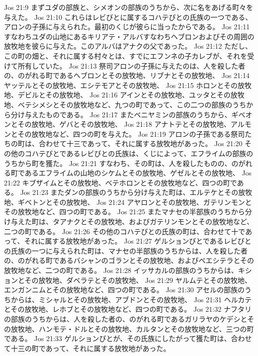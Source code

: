 Jos 21:9  まずユダの部族と、シメオンの部族のうちから、次に名をあげる町々を与えた。
Jos 21:10  これらはレビびとに属するコハテびとの氏族の一つである、アロンの子孫に与えられた。最初のくじが彼らに当ったからである。
Jos 21:11  すなわちユダの山地にあるキリアテ・アルバすなわちヘブロンおよびその周囲の放牧地を彼らに与えた。このアルバはアナクの父であった。
Jos 21:12  ただし、この町の畑と、それに属する村々とは、すでにエフンネの子カレブが、それを受けて所有していた。
Jos 21:13  祭司アロンの子孫に与えたのは、人を殺した者の、のがれる町であるヘブロンとその放牧地、リブナとその放牧地、
Jos 21:14  ヤッテルとその放牧地、エシテモアとその放牧地、
Jos 21:15  ホロンとその放牧地、デビルとその放牧地、
Jos 21:16  アインとその放牧地、ユッタとその放牧地、ベテシメシとその放牧地など、九つの町であって、この二つの部族のうちから分け与えたものである。
Jos 21:17  またベニヤミンの部族のうちから、ギベオンとその放牧地、ゲバとその放牧地、
Jos 21:18  アナトテとその放牧地、アルモンとその放牧地など、四つの町を与えた。
Jos 21:19  アロンの子孫である祭司たちの町は、合わせて十三であって、それに属する放牧地があった。
Jos 21:20  その他のコハテびとであるレビびとの氏族は、くじによって、エフライムの部族のうちから町を獲た。
Jos 21:21  すなわち、その町は、人を殺したものの、のがれる町であるエフライムの山地のシケムとその放牧地、ゲゼルとその放牧地、
Jos 21:22  キブザイムとその放牧地、ベテホロンとその放牧地など、四つの町である。
Jos 21:23  またダンの部族のうちから分け与えた町は、エルテケとその放牧地、ギベトンとその放牧地、
Jos 21:24  アヤロンとその放牧地、ガテリンモンとその放牧地など、四つの町である。
Jos 21:25  またマナセの半部族のうちから分け与えた町は、タアナクとその放牧地、およびガテリンモンとその放牧地など、二つの町である。
Jos 21:26  その他のコハテびとの氏族の町は、合わせて十であって、それに属する放牧地があった。
Jos 21:27  ゲルションびとであるレビびとの氏族の一つに与えられた町は、マナセの半部族のうちからは、人を殺した者の、のがれる町であるバシャンのゴランとその放牧地、およびベエシテラとその放牧地など、二つの町である。
Jos 21:28  イッサカルの部族のうちからは、キションとその放牧地、ダベラテとその放牧地、
Jos 21:29  ヤルムテとその放牧地、エンガンニムとその放牧地など、四つの町である。
Jos 21:30  アセルの部族のうちからは、ミシャルとその放牧地、アブドンとその放牧地、
Jos 21:31  ヘルカテとその放牧地、レホブとその放牧地など、四つの町である。
Jos 21:32  ナフタリの部族のうちからは、人を殺した者の、のがれる町であるガリラヤのケデシとその放牧地、ハンモテ・ドルとその放牧地、カルタンとその放牧地など、三つの町である。
Jos 21:33  ゲルションびとが、その氏族にしたがって獲た町は、合わせて十三の町であって、それに属する放牧地があった。
